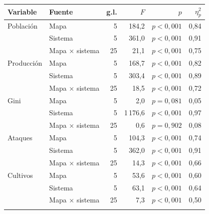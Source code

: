 \begin{tabular}{llrrrr}
\toprule
Variable & Fuente & g.l. & $F$ & $p$ & $\eta^2_p$ \\
\midrule
Población & Mapa & 5 & 184,2 & $p<0{,}001$ & 0,84 \\
 & Sistema & 5 & 361,0 & $p<0{,}001$ & 0,91 \\
 & Mapa × sistema & 25 & 21,1 & $p<0{,}001$ & 0,75 \\
\addlinespace
Producción & Mapa & 5 & 168,7 & $p<0{,}001$ & 0,82 \\
 & Sistema & 5 & 303,4 & $p<0{,}001$ & 0,89 \\
 & Mapa × sistema & 25 & 18,5 & $p<0{,}001$ & 0,72 \\
\addlinespace
Gini & Mapa & 5 & 2,0 & $p=0{,}081$ & 0,05 \\
 & Sistema & 5 & 1\,176,6 & $p<0{,}001$ & 0,97 \\
 & Mapa × sistema & 25 & 0,6 & $p=0{,}902$ & 0,08 \\
\addlinespace
Ataques & Mapa & 5 & 104,3 & $p<0{,}001$ & 0,74 \\
 & Sistema & 5 & 362,0 & $p<0{,}001$ & 0,91 \\
 & Mapa × sistema & 25 & 14,3 & $p<0{,}001$ & 0,66 \\
\addlinespace
Cultivos & Mapa & 5 & 53,6 & $p<0{,}001$ & 0,60 \\
 & Sistema & 5 & 63,1 & $p<0{,}001$ & 0,64 \\
 & Mapa × sistema & 25 & 7,3 & $p<0{,}001$ & 0,50 \\
\addlinespace
\bottomrule
\end{tabular}
